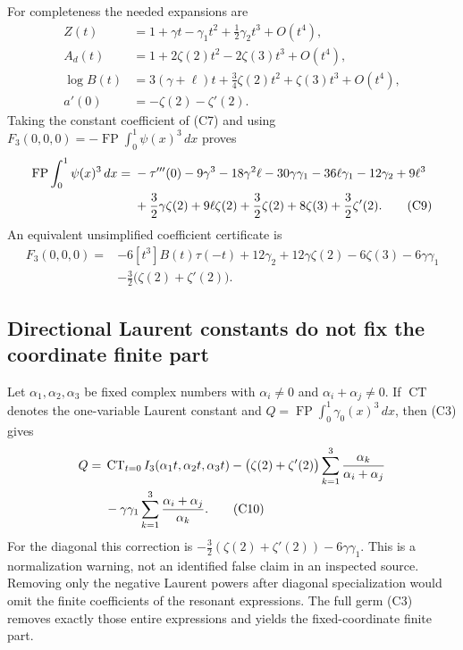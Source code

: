 For completeness the needed expansions are
\begin{align*}
 Z(t)&=1+\gamma t-\gamma_1t^2+\tfrac12\gamma_2t^3+O(t^4),\\
 A_d(t)&=1+2\zeta(2)t^2-2\zeta(3)t^3+O(t^4),\\
 \log B(t)&=3(\gamma+\ell)t+\tfrac34\zeta(2)t^2
                 +\zeta(3)t^3+O(t^4),\\
 a'(0)&=-\zeta(2)-\zeta'(2).
\end{align*}
Taking the constant coefficient of (C7) and using
$F_3(0,0,0)=-\operatorname{FP}\int_0^1\psi(x)^3\,dx$ proves
\begin{align}
 \operatorname{FP}\int_0^1\psi(x)^3\,dx={}&-\tau'''(0)
 -9\gamma^3-18\gamma^2\ell-30\gamma\gamma_1
 -36\ell\gamma_1-12\gamma_2+9\ell^3\notag\\
 &+\frac32\gamma\zeta(2)+9\ell\zeta(2)
 +\frac32\zeta(2)+8\zeta(3)+\frac32\zeta'(2). \tag{C9}\label{cub:C9}
\end{align}
An equivalent unsimplified coefficient certificate is
\begin{align*}
 F_3(0,0,0)={}&-6[t^3]B(t)\tau(-t)
 +12\gamma_2+12\gamma\zeta(2)-6\zeta(3)-6\gamma\gamma_1\\
 &-\tfrac32\bigl(\zeta(2)+\zeta'(2)\bigr).
\end{align*}

\subsection{Directional Laurent constants do not fix the coordinate finite part}

Let $\alpha_1,\alpha_2,\alpha_3$ be fixed complex numbers with
$\alpha_i\ne0$ and $\alpha_i+\alpha_j\ne0$. If $\operatorname{CT}$
denotes the one-variable Laurent constant and
$Q=\operatorname{FP}\int_0^1\gamma_0(x)^3\,dx$, then (C3) gives
\begin{align}
 Q={}&\operatorname{CT}_{t=0} I_3(\alpha_1t,\alpha_2t,\alpha_3t)
 -\bigl(\zeta(2)+\zeta'(2)\bigr)
       \sum_{k=1}^3\frac{\alpha_k}{\alpha_i+\alpha_j}\notag\\
 &-\gamma\gamma_1\sum_{k=1}^3\frac{\alpha_i+\alpha_j}{\alpha_k}.
                                                        \tag{C10}\label{cub:C10}
\end{align}
For the diagonal this correction is
$-\frac32(\zeta(2)+\zeta'(2))-6\gamma\gamma_1$.
This is a normalization warning, not an identified false claim in an
inspected source. Removing only the negative Laurent powers after
diagonal specialization would omit the finite coefficients of the
resonant expressions. The full germ (C3) removes exactly those entire
expressions and yields the fixed-coordinate finite part.

